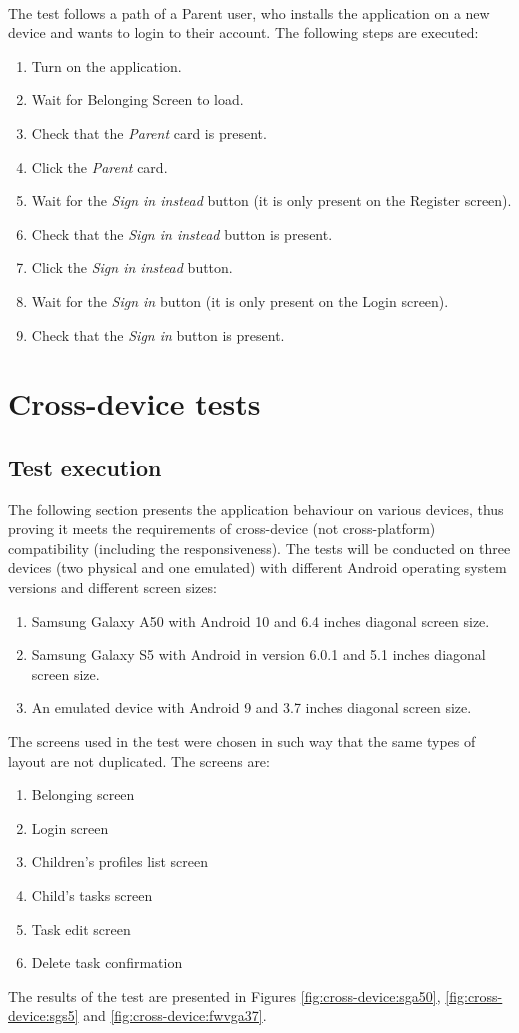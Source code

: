 \\
The test follows a path of a Parent user, who installs the application on a new device and wants to login to their account. The following steps are executed:
\begin{enumerate}
    \item Turn on the application.
    \item Wait for Belonging Screen to load.
    \item Check that the \textit{Parent} card is present.
    \item Click the \textit{Parent} card.
    \item Wait for the \textit{Sign in instead} button (it is only present on the Register screen).
    \item Check that the \textit{Sign in instead} button is present.
    \item Click the \textit{Sign in instead} button.
    \item Wait for the \textit{Sign in} button (it is only present on the Login screen).
    \item Check that the \textit{Sign in} button is present.
\end{enumerate}

\section{Cross-device tests}\label{sec:tests:cross-device}
\subsection{Test execution}
The following section presents the application behaviour on various devices, thus proving it meets the requirements of cross-device (not cross-platform) compatibility (including the responsiveness). The tests will be conducted on three devices (two physical and one emulated) with different Android operating system versions and different screen sizes:
\begin{enumerate}
    \item Samsung Galaxy A50 with Android 10 and 6.4 inches diagonal screen size.
    \item Samsung Galaxy S5 with Android in version 6.0.1 and 5.1 inches diagonal screen size.
    \item An emulated device with Android 9 and 3.7 inches diagonal screen size.
\end{enumerate}
The screens used in the test were chosen in such way that the same types of layout are not duplicated. The screens are:
\begin{enumerate}
    \item Belonging screen
    \item Login screen
    \item Children's profiles list screen
    \item Child's tasks screen
    \item Task edit screen
    \item Delete task confirmation
\end{enumerate}
The results of the test are presented in Figures \ref{fig:cross-device:sga50}, \ref{fig:cross-device:sgs5} and  \ref{fig:cross-device:fwvga37}.


